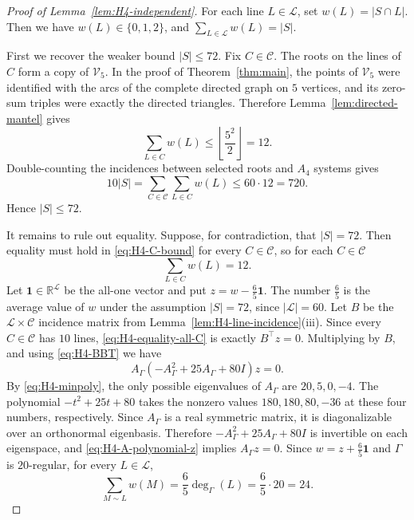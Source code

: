\documentclass[11pt]{article}
\theoremstyle{definition}
\begin{document}
\begin{proof}[Proof of Lemma~\ref{lem:H4-independent}]
For each line \(L\in\mathcal L\), set \(w(L)=|S\cap L|\). Then we have
\(w(L)\in\{0,1,2\}\), and \(\sum_{L\in\mathcal L}w(L)=|S|\).

First we recover the weaker bound \(|S|\le72\).  Fix \(C\in\mathcal C\).
The roots on the lines of \(C\) form a copy of \(\mathcal V_{5}\).  In the
proof of Theorem~\ref{thm:main}, the points of \(\mathcal V_{5}\) were
identified with the arcs of the complete directed graph on \(5\) vertices,
and its zero-sum triples were exactly the directed triangles.  Therefore Lemma~\ref{lem:directed-mantel} gives
\begin{equation}\label{eq:H4-C-bound}
    \sum_{L\in C}w(L)\le \left\lfloor\frac{5^{2}}{2}\right\rfloor=12.
\end{equation}
Double-counting the incidences between selected roots and
\(A_{4}\) systems gives
\[
    10|S|=\sum_{C\in\mathcal C}\sum_{L\in C}w(L)\le 60\cdot12=720.
\]
Hence \(|S|\le72\).

It remains to rule out equality.  Suppose, for contradiction, that
\(|S|=72\).  Then equality must hold in \eqref{eq:H4-C-bound} for every
\(C\in\mathcal{C}\), so for each \(C\in\mathcal{C}\)
\begin{equation}\label{eq:H4-equality-all-C}
    \sum_{L\in C}w(L)=12.
\end{equation}
Let \(\boldsymbol{1}\in\mathbb R^{\mathcal L}\) be the all-one vector and
put \(z=w-\frac{6}{5}\boldsymbol{1}\).  The number \(\frac{6}{5}\) is the
average value of \(w\) under the assumption \(|S|=72\), since
\(|\mathcal L|=60\).  Let \(B\) be the \(\mathcal L\times\mathcal C\)
incidence matrix from Lemma~\ref{lem:H4-line-incidence}(iii).  Since every
\(C\in\mathcal C\) has \(10\) lines, \eqref{eq:H4-equality-all-C} is
exactly \(B^\top z=0\).
Multiplying by \(B\), and using \eqref{eq:H4-BBT} we have
\begin{equation}\label{eq:H4-A-polynomial-z}
    A_{\Gamma}(-A_{\Gamma}^{2}+25A_{\Gamma}+80I)z=0.
\end{equation}
By \eqref{eq:H4-minpoly}, the only possible eigenvalues of \(A_{\Gamma}\)
are \(20,5,0,-4\).  The polynomial \(-t^{2}+25t+80\) takes the nonzero
values \(180,180,80,-36\) at these four numbers, respectively.  Since
\(A_{\Gamma}\) is a real symmetric matrix, it is diagonalizable over an
orthonormal eigenbasis.  Therefore
\(-A_{\Gamma}^{2}+25A_{\Gamma}+80I\) is invertible on each eigenspace, and
\eqref{eq:H4-A-polynomial-z} implies \(A_{\Gamma} z=0\). Since
\(w=z+\frac{6}{5}\boldsymbol{1}\) and \(\Gamma\) is \(20\)-regular, for
every \(L\in\mathcal L\),
\begin{equation}\label{eq:H4-neighbor-weight}
    \sum_{M\sim L}w(M)=\frac{6}{5}\deg_{\Gamma}(L)=\frac{6}{5}\cdot20=24.   
\end{equation}


\end{proof}
\end{document}
